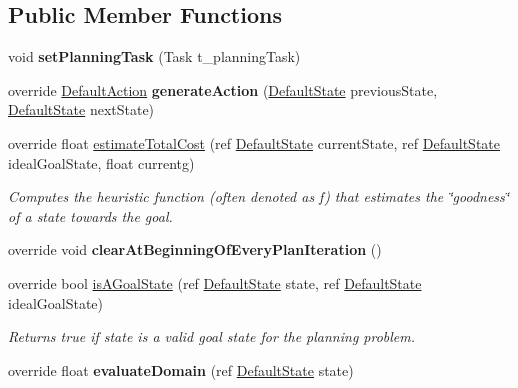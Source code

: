\subsection*{Public Member Functions}
\begin{DoxyCompactItemize}
\item 
\hypertarget{class_best_first_domain_a0b833b1832b075b88de09a79e277371b}{void {\bfseries set\-Planning\-Task} (Task t\-\_\-planning\-Task)}\label{class_best_first_domain_a0b833b1832b075b88de09a79e277371b}

\item 
\hypertarget{class_best_first_domain_a9b578aa834211cc398d3b1bbfb106752}{override \hyperlink{class_default_action}{Default\-Action} {\bfseries generate\-Action} (\hyperlink{class_default_state}{Default\-State} previous\-State, \hyperlink{class_default_state}{Default\-State} next\-State)}\label{class_best_first_domain_a9b578aa834211cc398d3b1bbfb106752}

\item 
override float \hyperlink{class_best_first_domain_a5e473a66ee8ebaec2674a63d06e6e278}{estimate\-Total\-Cost} (ref \hyperlink{class_default_state}{Default\-State} current\-State, ref \hyperlink{class_default_state}{Default\-State} ideal\-Goal\-State, float currentg)
\begin{DoxyCompactList}\small\item\em Computes the heuristic function (often denoted as f) that estimates the \char`\"{}goodness\char`\"{} of a state towards the goal. \end{DoxyCompactList}\item 
\hypertarget{class_best_first_domain_aadbbb1d21970c154374964f50b2a99d4}{override void {\bfseries clear\-At\-Beginning\-Of\-Every\-Plan\-Iteration} ()}\label{class_best_first_domain_aadbbb1d21970c154374964f50b2a99d4}

\item 
override bool \hyperlink{class_best_first_domain_a0f03bd6bd5617405d56f204732888d38}{is\-A\-Goal\-State} (ref \hyperlink{class_default_state}{Default\-State} state, ref \hyperlink{class_default_state}{Default\-State} ideal\-Goal\-State)
\begin{DoxyCompactList}\small\item\em Returns true if state is a valid goal state for the planning problem. \end{DoxyCompactList}\item 
\hypertarget{class_best_first_domain_a3b861f1177419c91174fa9b63b7d784b}{override float {\bfseries evaluate\-Domain} (ref \hyperlink{class_default_state}{Default\-State} state)}\label{class_best_first_domain_a3b861f1177419c91174fa9b63b7d784b}


\end{DoxyCompactItemize}
